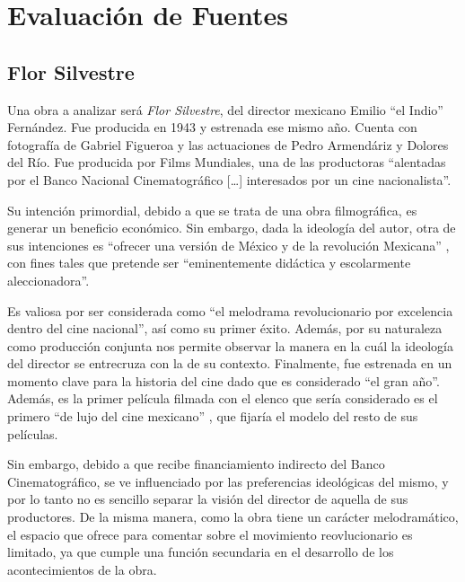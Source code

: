 \section{Evaluación de Fuentes}
\subsection{Flor Silvestre}
Una obra a analizar será \textit{Flor Silvestre}, del director mexicano Emilio ``el Indio'' Fernández. 
Fue producida en 1943 y estrenada ese mismo año\autocite[17]{garcia_riera_historia_1992}. Cuenta con fotografía de Gabriel Figueroa y las actuaciones de Pedro Armendáriz y Dolores del Río\autocite[16]{garcia_riera_historia_1992}. Fue producida por Films Mundiales\autocite[17]{garcia_riera_historia_1992}, una de las productoras ``alentadas por el Banco Nacional Cinematográfico [\ldots] interesados por un cine nacionalista''.\autocite[10]{garcia_riera_historia_1992}

Su intención primordial, debido a que se trata de una obra filmográfica, es generar un beneficio económico.
Sin embargo, dada la ideología del autor, otra de sus intenciones es ``ofrecer una versión de México y de la revolución Mexicana''%
, con fines tales que pretende ser ``eminentemente didáctica y escolarmente aleccionadora''\autocite[28]{blanco_aventura_1993}.

Es valiosa por ser considerada como ``el melodrama revolucionario por excelencia dentro del cine
nacional''\autocite[178]{guerrero_imagen_2005},
así como su primer éxito\autocite[19]{costa_cine_2010}.
Además, por su naturaleza como producción conjunta nos permite observar la manera en la cuál la ideología del director se entrecruza con la de su contexto. 
Finalmente, fue estrenada en un momento clave para la historia del cine dado que es considerado ``el gran año''\autocite[7]{garcia_riera_historia_1992}.
Además, es la primer película filmada con el elenco que sería considerado es el primero ``de lujo del cine mexicano''\autocite[19]{garcia_riera_historia_1992}
, que fijaría el modelo del resto de sus películas\autocite[86]{demello_unfinished_2001}.

Sin embargo, debido a que recibe financiamiento indirecto del Banco Cinematográfico,
se ve influenciado por las preferencias ideológicas del mismo, y por lo tanto no es sencillo separar la visión del director de aquella de sus productores. 
De la misma manera, como la obra tiene un carácter melodramático, el espacio que ofrece para comentar sobre el movimiento reovlucionario es limitado, ya que cumple una función secundaria en el desarrollo de los acontecimientos de la obra.\autocite[365]{sanchez_vi._2010}
 
